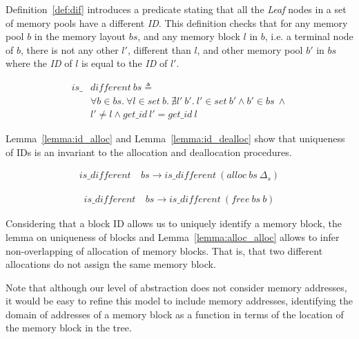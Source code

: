 Definition~\ref{def:dif} introduces a predicate stating that all the \emph{Leaf} nodes in a set of memory pools have a different \emph{ID}. This definition checks that for any memory pool $b$ in the memory layout $bs$, and any memory block $l$ in $b$, i.e. a terminal node of $b$, there is not any other $l'$, different than $l$, and other memory pool $b'$ in $bs$ where the \emph{ID} of $l$ is equal to the \emph{ID} of $l'$.

\begin{definition} 
\label{def:dif}
\end{definition}
\vspace{-7pt}
\begin{align*}
is\_&different\ bs \triangleq\\
&\forall b \in bs.\ \forall l \in set\ b.\ \nexists l'\ b'.\ l' \in set\ b' \wedge b' \in bs\ \wedge\\
&l' \ne l \wedge get\_id\ l' = get\_id\ l
\end{align*}
\vspace{-12pt}

Lemma~\ref{lemma:id_alloc} and Lemma~\ref{lemma:id_dealloc} show that uniqueness of IDs is an invariant to the allocation and deallocation procedures.

\begin{lemma}  \label{lemma:id_alloc}
\begin{align*}
is\_different\ &bs \longrightarrow is\_different\ (alloc\ bs\ \Delta_s)
\end{align*}
\end{lemma}

\begin{lemma}  \label{lemma:id_dealloc}
\begin{align*}
is\_different\ &bs \longrightarrow is\_different\ (free\ bs\ b)
\end{align*}
\end{lemma}

Considering that a block ID allows us to uniquely identify a memory block, the lemma on uniqueness of blocks and Lemma~\ref{lemma:alloc_alloc} allows to infer non-overlapping of allocation of memory blocks. That is, that two different allocations do not assign the same memory block.

Note that although our level of abstraction does not consider memory addresses, it would be easy to refine this model to include memory addresses, identifying the domain of addresses of a memory block as a function in terms of the location of the memory block in the tree.

